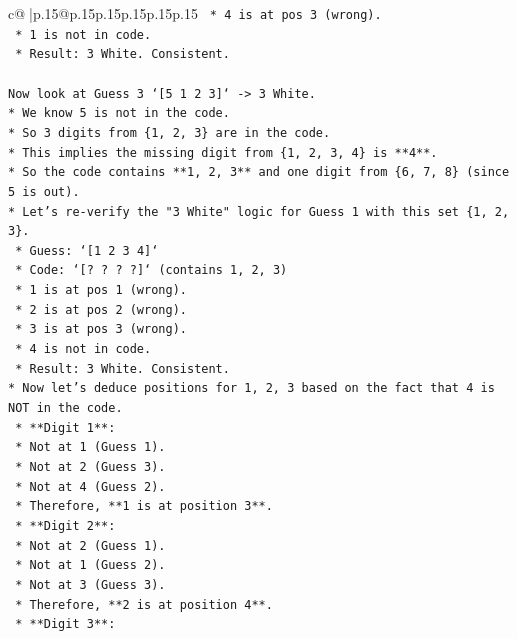 \documentclass{article}
\begin{document}
{\begin{supertabular}{c@{$\;$}|p{.15\linewidth}@{}p{.15\linewidth}p{.15\linewidth}p{.15\linewidth}p{.15\linewidth}p{.15\linewidth}}
{{{\texttt{    *   4 is at pos 3 (wrong).} \\
\texttt{    *   1 is not in code.} \\
\texttt{    *   Result: 3 White. Consistent.} \\
\\ 
\texttt{Now look at Guess 3 `{[}5 1 2 3{]}` {-}> 3 White.} \\
\texttt{*   We know 5 is not in the code.} \\
\texttt{*   So 3 digits from \{1, 2, 3\} are in the code.} \\
\texttt{*   This implies the missing digit from \{1, 2, 3, 4\} is **4**.} \\
\texttt{*   So the code contains **1, 2, 3** and one digit from \{6, 7, 8\} (since 5 is out).} \\
\texttt{*   Let's re{-}verify the "3 White" logic for Guess 1 with this set \{1, 2, 3\}.} \\
\texttt{    *   Guess: `{[}1 2 3 4{]}`} \\
\texttt{    *   Code: `{[}? ? ? ?{]}` (contains 1, 2, 3)} \\
\texttt{    *   1 is at pos 1 (wrong).} \\
\texttt{    *   2 is at pos 2 (wrong).} \\
\texttt{    *   3 is at pos 3 (wrong).} \\
\texttt{    *   4 is not in code.} \\
\texttt{    *   Result: 3 White. Consistent.} \\
\texttt{*   Now let's deduce positions for 1, 2, 3 based on the fact that 4 is NOT in the code.} \\
\texttt{    *   **Digit 1**:} \\
\texttt{        *   Not at 1 (Guess 1).} \\
\texttt{        *   Not at 2 (Guess 3).} \\
\texttt{        *   Not at 4 (Guess 2).} \\
\texttt{        *   Therefore, **1 is at position 3**.} \\
\texttt{    *   **Digit 2**:} \\
\texttt{        *   Not at 2 (Guess 1).} \\
\texttt{        *   Not at 1 (Guess 2).} \\
\texttt{        *   Not at 3 (Guess 3).} \\
\texttt{        *   Therefore, **2 is at position 4**.} \\
\texttt{    *   **Digit 3**:} \\
}}}
\end{supertabular}}
\end{document}
